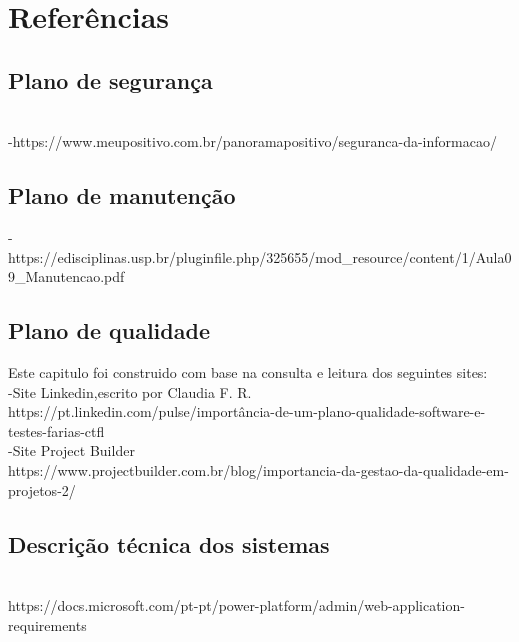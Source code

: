 \chapter{Referências}
\label{referencias}
\section{Plano de segurança}
\\
-https://www.meupositivo.com.br/panoramapositivo/seguranca-da-informacao/ \\

\section{Plano de manutenção}
-https://edisciplinas.usp.br/pluginfile.php/325655/mod_resource/content/1/Aula09_Manutencao.pdf\\

\section{Plano de qualidade}
Este capitulo foi construido com base na consulta e leitura dos seguintes sites:\\
-Site Linkedin,escrito por Claudia F. R. \\
https://pt.linkedin.com/pulse/importância-de-um-plano-qualidade-software-e-testes-farias-ctfl \\
-Site Project Builder\\
https://www.projectbuilder.com.br/blog/importancia-da-gestao-da-qualidade-em-projetos-2/\\

\section{Descrição técnica dos sistemas}
\\
https://docs.microsoft.com/pt-pt/power-platform/admin/web-application-requirements\\
